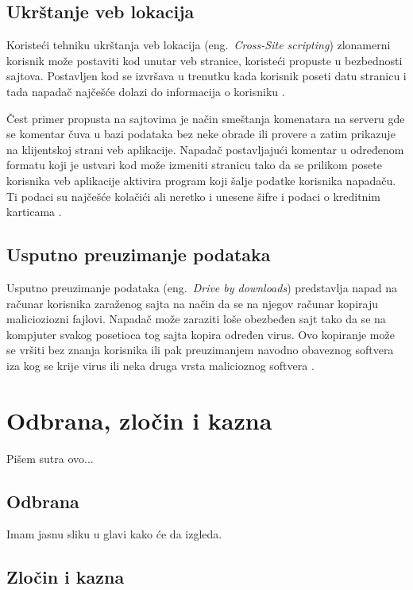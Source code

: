 \documentclass[a4paper]{article}
\begin{document}
\subsection{Ukrštanje veb lokacija}

Koristeći tehniku ukrštanja veb lokacija (eng.~{\em Cross-Site scripting}) zlonamerni korisnik može postaviti kod unutar veb stranice, koristeći propuste u bezbednosti sajtova. Postavljen kod se izvršava u trenutku kada korisnik poseti datu stranicu i tada napadač najčešće dolazi do informacija o korisniku \cite{ethics,xss}.

Čest primer propusta na sajtovima je način smeštanja komenatara na serveru gde se komentar čuva u bazi podataka bez neke obrade ili provere a zatim prikazuje na klijentskoj strani veb aplikacije. Napadač postavljajući komentar u određenom formatu koji je ustvari kod može izmeniti stranicu tako da se prilikom posete korisnika veb aplikacije aktivira program koji šalje podatke korisnika napadaču. Ti podaci su najčešće kolačići ali neretko i unesene šifre i podaci o kreditnim karticama \cite{xss}.

\subsection{Usputno preuzimanje podataka }

Usputno preuzimanje podataka (eng.~{\em Drive by downloads}) predstavlja napad na računar korisnika zaraženog sajta na način da se 
na njegov računar kopiraju malicioziozni fajlovi. Napadač može zaraziti loše obezbeđen sajt tako da se na kompjuter svakog posetioca tog sajta kopira određen virus. Ovo kopiranje može se vršiti bez znanja korisnika ili pak preuzimanjem navodno obaveznog softvera iza kog se krije virus ili neka druga vrsta malicioznog softvera \cite{drivebydownloads, ethics}.

\section{Odbrana, zločin i kazna}

Pišem sutra ovo...

\subsection{Odbrana}

Imam jasnu sliku u glavi kako će da izgleda.

\subsection{Zločin i kazna}
\end{document}
